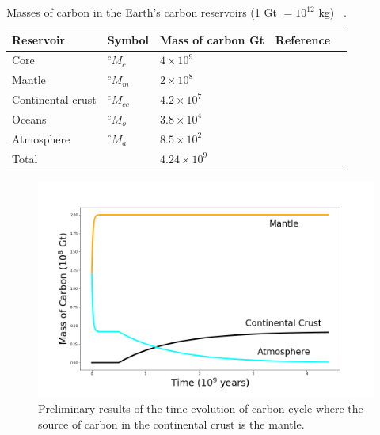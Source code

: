 {\renewcommand{\arraystretch}{2.0}%
\begin{table}[h!]
    \centering
    \begin{tabular}{|l|l|l|c|c|}
        \hline
        Reservoir & Symbol & Mass of carbon Gt & Reference \\
        \hline
        Core   & $^cM_c$ & $4 \times 10^9$ & ~\citet{DR:2013}  \\
        \hline
        Mantle & $^cM_m$ & $2 \times 10^8$ & ~\citet{KLH-TDL-WM:2017}  \\
        \hline
        Continental crust & $^cM_{cc}$ & $4.2 \times 10^7$ & ~\citet{KHW:1995} \\
        \hline
        Oceans & $^cM_o$ & $3.8 \times 10^4$ & ~\citet{HRA:2007} \\
        \hline
        Atmosphere & $^cM_a$ & $8.5 \times 10^2$ & ~\citet{NOAA:2017} \\
        \hline
        Total & & $4.24 \times 10^9$ & \\
        \hline
    \end{tabular}
    \caption{\doublespacing Masses of carbon in the Earth's carbon reservoirs (1 Gt $= 10^{12}$ kg) ~\cite{KLH-TDL-WM:2017}.
    }
    \label{Table:Masses of carbon in Earth's reservoirs}
\end{table}

\begin{figure}[h!]
  \centering
  \includegraphics[scale=0.4]{Figures/ModelM-CC.png}
  \caption{Preliminary results of the time evolution of carbon cycle where the source of carbon in the continental crust is the mantle.}
  \label{Fig:ModelM-CC}
\end{figure}

}
